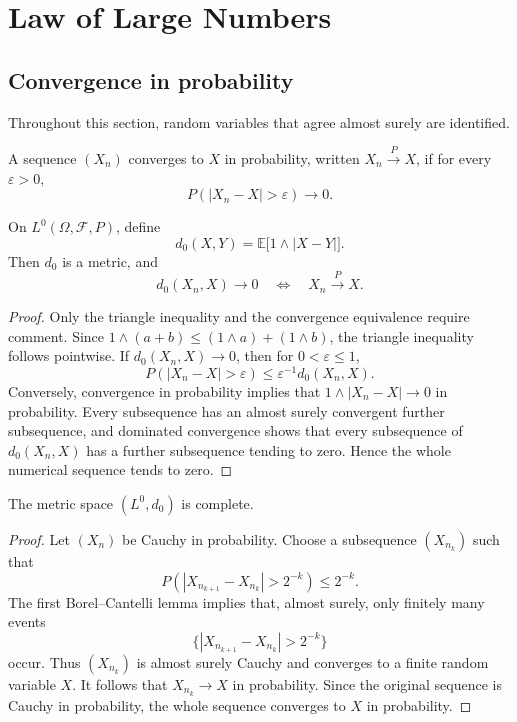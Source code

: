 \section{Law of Large Numbers}

\subsection{Convergence in probability}

Throughout this section, random variables that agree almost surely are
identified.

\begin{de}
A sequence $(X_n)$ converges to $X$ in probability, written
$X_n\xrightarrow{P}X$, if for every $\varepsilon>0$,
\[
P(|X_n-X|>\varepsilon)\longrightarrow0.
\]
\end{de}

\begin{prop}
On $L^0(\Omega,\mathcal F,P)$, define
\[
d_0(X,Y)=\mathbb E\bigl[1\wedge|X-Y|\bigr].
\]
Then $d_0$ is a metric, and
\[
d_0(X_n,X)\to0
\quad\Longleftrightarrow\quad
X_n\xrightarrow{P}X.
\]
\end{prop}

\begin{proof}
Only the triangle inequality and the convergence equivalence require
comment. Since $1\wedge(a+b)\leq(1\wedge a)+(1\wedge b)$, the triangle
inequality follows pointwise. If $d_0(X_n,X)\to0$, then for
$0<\varepsilon\leq1$,
\[
P(|X_n-X|>\varepsilon)
 \leq\varepsilon^{-1}d_0(X_n,X).
\]
Conversely, convergence in probability implies that
$1\wedge|X_n-X|\to0$ in probability. Every subsequence has an almost surely
convergent further subsequence, and dominated convergence shows that every
subsequence of $d_0(X_n,X)$ has a further subsequence tending to zero. Hence
the whole numerical sequence tends to zero.
\end{proof}

\begin{thm}[Completeness of $L^0$]
The metric space $(L^0,d_0)$ is complete.
\end{thm}

\begin{proof}
Let $(X_n)$ be Cauchy in probability. Choose a subsequence $(X_{n_k})$ such
that
\[
P(|X_{n_{k+1}}-X_{n_k}|>2^{-k})\leq2^{-k}.
\]
The first Borel--Cantelli lemma implies that, almost surely, only finitely many
events
\[
\{|X_{n_{k+1}}-X_{n_k}|>2^{-k}\}
\]
occur. Thus $(X_{n_k})$ is almost surely Cauchy and converges to a finite
random variable $X$. It follows that
$X_{n_k}\to X$ in probability. Since the original sequence is Cauchy in
probability, the whole sequence converges to $X$ in probability.
\end{proof}

